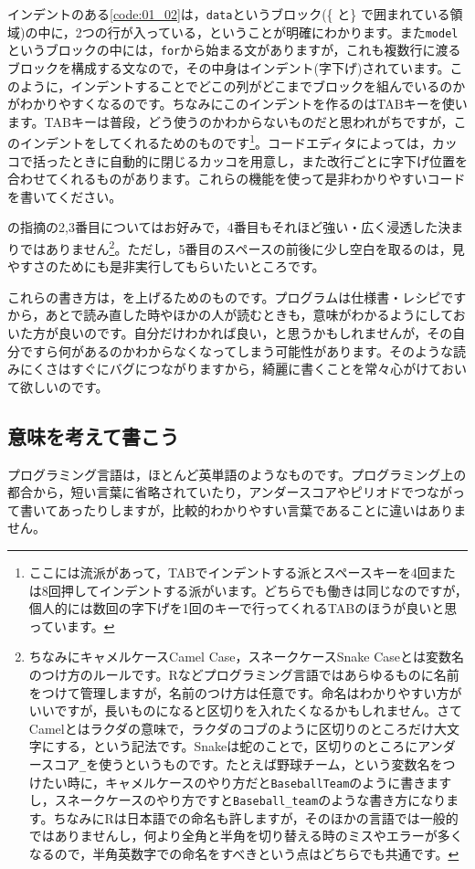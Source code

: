 \documentclass{ltjsbook}
\begin{document}
インデントのある\ref{code:01_02}は，\texttt{data}というブロック(\{ と\} で囲まれている領域)の中に，2つの行が入っている，ということが明確にわかります。また\texttt{model}というブロックの中には，\texttt{for}から始まる文がありますが，これも複数行に渡るブロックを構成する文なので，その中身はインデント(字下げ)されています。このように，インデントすることでどこの列がどこまでブロックを組んでいるのかがわかりやすくなるのです。ちなみにこのインデントを作るのはTABキーを使います。TABキーは普段，どう使うのかわからないものだと思われがちですが，このインデントをしてくれるためのものです\footnote{ここには流派があって，TABでインデントする派とスペースキーを4回または8回押してインデントする派がいます。どちらでも働きは同じなのですが，個人的には数回の字下げを1回のキーで行ってくれるTABのほうが良いと思っています。}。コードエディタによっては，カッコで括ったときに自動的に閉じるカッコを用意し，また改行ごとに字下げ位置を合わせてくれるものがあります。これらの機能を使って是非わかりやすいコードを書いてください。

\textcite{Matsuura201610}の指摘の2,3番目についてはお好みで，4番目もそれほど強い・広く浸透した決まりではありません\footnote{ちなみにキャメルケースCamel Case，スネークケースSnake Caseとは変数名のつけ方のルールです。Rなどプログラミング言語ではあらゆるものに名前をつけて管理しますが，名前のつけ方は任意です。命名はわかりやすい方がいいですが，長いものになると区切りを入れたくなるかもしれません。さてCamelとはラクダの意味で，ラクダのコブのように区切りのところだけ大文字にする，という記法です。Snakeは蛇のことで，区切りのところにアンダースコア\verb|_|を使うというものです。たとえば野球チーム，という変数名をつけたい時に，キャメルケースのやり方だと\texttt{BaseballTeam}のように書きますし，スネークケースのやり方ですと\verb|Baseball_team|のような書き方になります。ちなみにRは日本語での命名も許しますが，そのほかの言語では一般的ではありませんし，何より全角と半角を切り替える時のミスやエラーが多くなるので，半角英数字での命名をすべきという点はどちらでも共通です。}。ただし，5番目のスペースの前後に少し空白を取るのは，見やすさのためにも是非実行してもらいたいところです。

これらの書き方は，を上げるためのものです。プログラムは仕様書・レシピですから，あとで読み直した時やほかの人が読むときも，意味がわかるようにしておいた方が良いのです。自分だけわかれば良い，と思うかもしれませんが，その自分ですら何があるのかわからなくなってしまう可能性があります。そのような読みにくさはすぐにバグにつながりますから，綺麗に書くことを常々心がけておいて欲しいのです。

\subsection{意味を考えて書こう}
プログラミング言語は，ほとんど英単語のようなものです。プログラミング上の都合から，短い言葉に省略されていたり，アンダースコアやピリオドでつながって書いてあったりしますが，比較的わかりやすい言葉であることに違いはありません。
\end{document}
